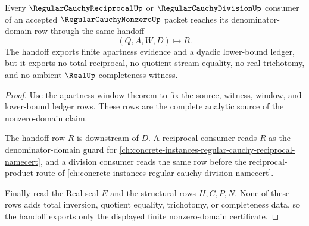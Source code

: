 \begin{theorem}
\label{thm:regular-cauchy-nonzero-reciprocal-domain-handoff}
Every $\RegularCauchyReciprocalUp$ or $\RegularCauchyDivisionUp$ consumer of an accepted $\RegularCauchyNonzeroUp$ packet reaches its denominator-domain row through the same handoff
$$
(Q,A,W,D)\longmapsto R.
$$
The handoff exports finite apartness evidence and a dyadic lower-bound ledger, but it exports no total reciprocal, no quotient stream equality, no real trichotomy, and no ambient $\RealUp$ completeness witness.
\end{theorem}
\begin{proof}
Use the apartness-window theorem to fix the source, witness, window, and lower-bound ledger rows. These rows are the complete analytic source of the nonzero-domain claim.

The handoff row $R$ is downstream of $D$. A reciprocal consumer reads $R$ as the denominator-domain guard for \autoref{ch:concrete-instances-regular-cauchy-reciprocal-namecert}, and a division consumer reads the same row before the reciprocal-product route of \autoref{ch:concrete-instances-regular-cauchy-division-namecert}.

Finally read the Real seal $E$ and the structural rows $H,C,P,N$. None of these rows adds total inversion, quotient equality, trichotomy, or completeness data, so the handoff exports only the displayed finite nonzero-domain certificate.
\end{proof}


\begin{closurestatus}{\RegularCauchyNonzeroUp}
  \theoryclosure{\seedClosure}
  \formalstatus{\unformalizedV}
\end{closurestatus}
